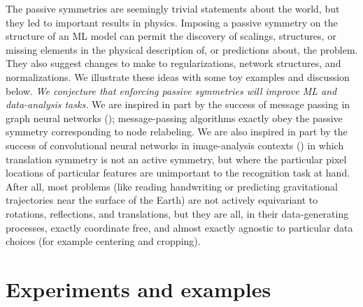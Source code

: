 \documentclass{article} %
\begin{document}
The passive symmetries are seemingly trivial statements about the world, but they led to important results in physics.
Imposing a passive symmetry on the structure of an ML model can permit the discovery of scalings, structures, or missing elements in the physical description of, or predictions about, the problem.
They also suggest changes to make to regularizations, network structures, and normalizations.
We illustrate these ideas with some toy examples and discussion below.
\emph{We conjecture that enforcing passive symmetries will improve ML and data-analysis tasks.}
We are inspired in part by the success of message passing in graph neural networks (\cite{hamilton2020graph});
message-passing algorithms exactly obey the passive symmetry corresponding to node relabeling.
We are also inspired in part by the success of convolutional neural networks in image-analysis contexts (\cite{lecun1989backpropagation}) in which translation symmetry is not an active symmetry, but where the particular pixel locations of particular features are unimportant to the recognition task at hand.
After all, most problems (like reading handwriting or predicting gravitational trajectories near the surface of the Earth) are not actively equivariant to rotations, reflections, and translations, but they are all, in their data-generating processes, exactly coordinate free, and almost exactly agnostic to particular data choices (for example centering and cropping).

\section{Experiments and examples}\label{sec:experiments}
\end{document}
